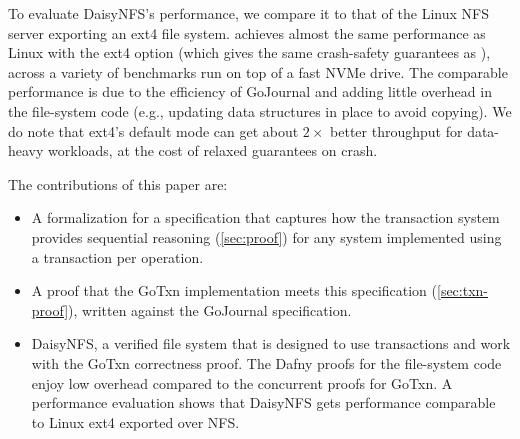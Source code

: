 
To evaluate DaisyNFS's performance, we compare it to that of the Linux NFS server
exporting an ext4 file system. \sys achieves almost the same performance as
Linux with the ext4  option (which gives the same crash-safety
guarantees as \sys), across a variety of benchmarks run on top of a fast NVMe
drive. The comparable performance is due to the efficiency of GoJournal and
adding little overhead in the file-system code (e.g., updating data structures
in place to avoid copying). We do note that ext4's default 
mode can get about $2\times$ better throughput for data-heavy workloads, at the
cost of relaxed guarantees on crash.

The contributions of this paper are:
\begin{itemize}
  \item A formalization for a specification that captures how the transaction
  system provides sequential reasoning (\autoref{sec:proof}) for any system
  implemented using a transaction per operation.
  \item A proof that the GoTxn implementation meets this specification
(\autoref{sec:txn-proof}), written against the GoJournal specification.
  \item DaisyNFS, a verified file system that is designed to use transactions
  and work with the GoTxn correctness proof. The Dafny proofs for the
  file-system code enjoy low overhead compared to the concurrent proofs for GoTxn. A performance
  evaluation shows that DaisyNFS gets performance comparable to Linux ext4
  exported over NFS.
\end{itemize}

